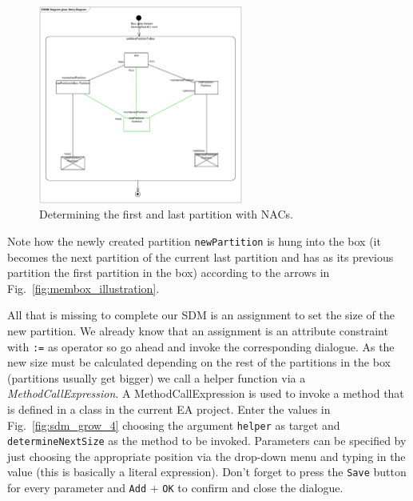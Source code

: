 \begin{figure}[htbp]
\begin{center}
  \includegraphics[width=0.6\textwidth]{pics/sdmBilder/grow/sdm65}
  \caption{Determining the first and last partition with NACs.}  
  \label{fig:sdm_grow_3}
\end{center}
\end{figure}
 
Note how the newly created partition
\texttt{newPartition} is hung into the box (it becomes the next partition of the
current last partition and has as its previous partition the first partition
in the box) according to the arrows in Fig.~\ref{fig:membox_illustration}.
  
All that is missing to complete our SDM is an assignment to set the size of the
new partition.  We already know that an assignment is an attribute
constraint with \texttt{:=} as operator so go ahead and invoke the corresponding
dialogue.  As the new size must be calculated depending on the rest of the
partitions in the box (partitions usually get bigger) we call a helper function
via a \emph{MethodCallExpression}.  A MethodCallExpression is used to invoke a
method that is defined in a class in the current EA project.  Enter the values
in Fig.~\ref{fig:sdm_grow_4} choosing the argument \texttt{helper} as target and
\texttt{determineNextSize} as the method to be invoked.  Parameters can be
specified by just choosing the appropriate position via the drop-down menu and
typing in the value (this is basically a literal expression).  Don't forget to
press the \texttt{Save} button for every parameter and \texttt{Add} +
\texttt{OK} to confirm and close the dialogue.
\clearpage
 
